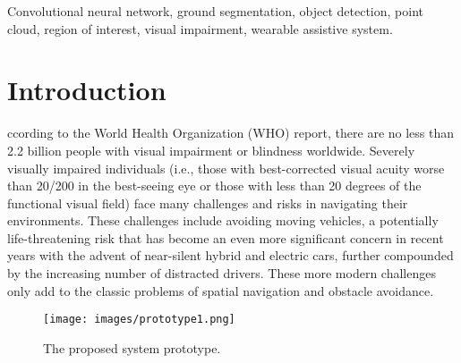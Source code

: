 \documentclass{ieeeaccess}
\begin{document}
\begin{keywords}
Convolutional neural network, ground segmentation, object detection, point cloud, region of interest, visual impairment, wearable assistive system.
\end{keywords}

\titlepgskip=-15pt

\maketitle

\section{Introduction}
\label{sec:introduction}
ccording to the World Health Organization (WHO) report\cite{IEEEexample:WHO}, there are no less than 2.2 billion people with visual impairment or blindness worldwide. Severely visually impaired individuals (i.e., those with best-corrected visual acuity worse than 20/200 in the best-seeing eye or those with less than 20 degrees of the functional visual field) face many challenges and risks in navigating their environments. These challenges include avoiding moving vehicles, a potentially life-threatening risk that has become an even more significant concern in recent years with the advent of near-silent hybrid and electric cars, further compounded by the increasing number of distracted drivers. These more modern challenges only add to the classic problems of spatial navigation and obstacle avoidance.

\begin{figure}[t]
    \centering
    \texttt{[image: images/prototype1.png]}
    \caption{The proposed system prototype.}
    \label{fig:prototype}%
\end{figure}
\end{document}
